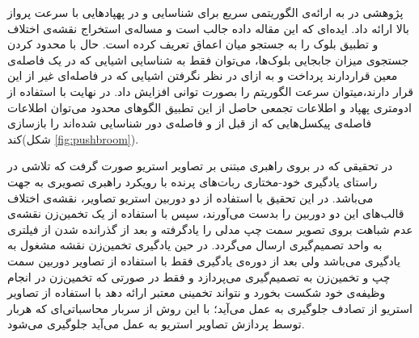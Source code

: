 پژوهشی در  به ارائه‌ی الگوریتمی سریع برای شناسایی و  در پهپادهایی با سرعت پرواز بالا ارائه داد. ایده‌ای که این مقاله داده جالب است و مساله‌ی استخراج نقشه‌ی اختلاف و تطبیق بلوک را به جستجو میان اعماق تعریف کرده است. حال با محدود کردن جستجوی میزان جابجایی بلوک‌ها، می‌توان فقط به شناسایی اشیایی که در یک فاصله‌ی معین قراردارند پرداخت و به ازای در نظر نگرفتن اشیایی که در فاصله‌ای غیر از این قرار دارند،میتوان سرعت الگوریتم را بصورت توانی افزایش داد. در نهایت با استفاده از ادومتری پهپاد و اطلاعات تجمعی حاصل از این تطبیق الگوهای محدود می‌توان اطلاعات فاصله‌ی پیکسل‌هایی که از قبل از و فاصله‌ی دور شناسایی شده‌اند را بازسازی کند(شکل \ref{fig:pushbroom}).


در تحقیقی که در  بروی راهبری مبتنی بر تصاویر استریو صورت گرفت که تلاشی در راستای یادگیری خود-مختاری ربات‌های پرنده با رویکرد راهبری تصویری به جهت  می‌باشد. در این تحقیق با استفاده از دو دوربین استریو تصاویر، نقشه‌ی اختلاف قالب‌های این دو دوربین را بدست می‌آورند، سپس با استفاده از یک تخمین‌زن نقشه‌ی عدم شباهت بروی تصویر سمت چپ مدلی را یادگرفته و بعد از گذرانده شدن از فیلتری به واحد تصمیم‌گیری ارسال می‌گردد. در حین یادگیری تخمین‌‌زن نقشه مشغول به یادگیری می‌باشد ولی بعد از دوره‌ی یادگیری فقط با استفاده از تصاویر دوربین سمت چپ و تخمین‌زن به تصمیم‌گیری می‌پردازد و فقط در صورتی که تخمین‌زن در انجام وظیفه‌ی خود شکست بخورد و نتواند تخمینی معتبر ارائه دهد با استفاده از تصاویر استریو از تصادف جلوگیری به عمل می‌آید؛ با این روش از سربار محاسباتی‌ای که هربار توسط پردازش تصاویر استریو به عمل می‌آید جلوگیری می‌شود.